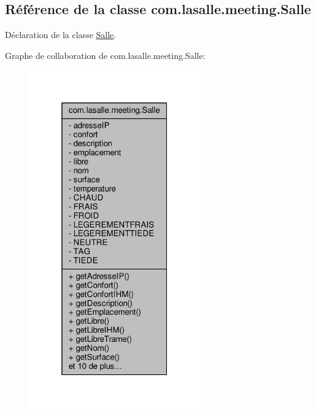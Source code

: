 \hypertarget{classcom_1_1lasalle_1_1meeting_1_1_salle}{}\subsection{Référence de la classe com.\+lasalle.\+meeting.\+Salle}
\label{classcom_1_1lasalle_1_1meeting_1_1_salle}


Déclaration de la classe \hyperlink{classcom_1_1lasalle_1_1meeting_1_1_salle}{Salle}.  




Graphe de collaboration de com.\+lasalle.\+meeting.\+Salle\+:
\nopagebreak
\begin{figure}[H]
\begin{center}
\leavevmode
\includegraphics[width=208pt]{classcom_1_1lasalle_1_1meeting_1_1_salle__coll__graph}
\end{center}
\end{figure}
